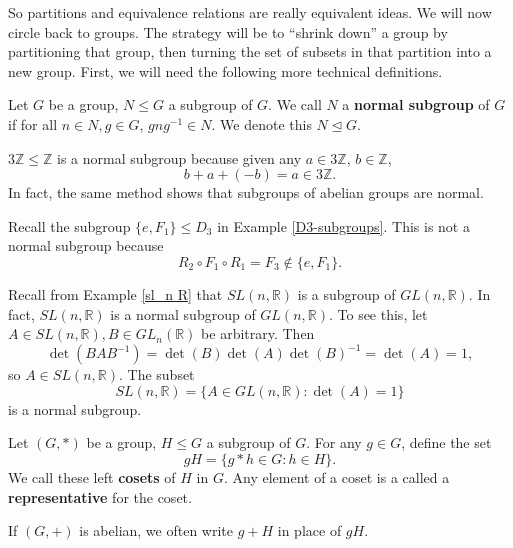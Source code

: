 \documentclass{amsart}
\begin{document}
So partitions and equivalence relations are really equivalent ideas. We will
now circle back to groups. The strategy will be to ``shrink down'' a group by
partitioning that group, then turning the set of subsets in that partition into
a new group. First, we will need the following more technical definitions.

\begin{definition}
	Let \(G\) be a group, \(N\le G\) a subgroup of \(G\). We call \(N\) a
	\textbf{normal subgroup} of \(G\) if for all \(n\in N, g\in G\),
	\(gng^{-1}\in N\). We denote this \(N\trianglelefteq G\).
\end{definition}
\begin{example}\label{3Z-coset}
   \(3\mathbb{Z}\le\mathbb{Z}\) is a normal subgroup because given any
	\(a\in3\mathbb{Z}\), \(b\in \mathbb{Z}\), 
	\[
		b + a + (-b) = a\in 3\mathbb{Z}.
	\]
	In fact, the same method shows that subgroups of abelian groups are
	normal.
\end{example}

\begin{example}\label{not-normal}
	Recall the subgroup \(\{e, F_1\}\le D_3\) in Example \ref{D3-subgroups}.
	This is not a normal subgroup because 
	\[
	   R_2\circ F_1\circ R_1 = F_3\notin \{e, F_1\}.
	\]
\end{example}

\begin{example}\label{sl-normal}
	Recall from Example \ref{sl_n R} that \(SL(n, \mathbb{R})\) is a subgroup of
	\(GL(n, \mathbb{R})\). In fact, \(SL(n, \mathbb{R})\) is a normal subgroup
	of \(GL(n, \mathbb{R})\). To see this, let \(A\in SL(n, \mathbb{R}), B\in
	GL_n(\mathbb{R})\) be
	arbitrary. Then 
	\[
		\det(BAB^{-1}) = \det(B)\det(A)\det(B)^{-1} = \det(A) = 1,
	\]
	so \(A\in SL(n, \mathbb{R})\). The subset 
	\[
	   SL(n, \mathbb{R}) = \{A\in GL(n, \mathbb{R}) : \det(A) = 1\}
	\]
	is a normal subgroup.
\end{example}

\begin{definition}
	Let \((G, \ast)\) be a group, \(H\le G\) a subgroup of \(G\). For any
	\(g\in G\),	define the set 
	\[
		gH = \{g\ast h\in G: h\in H\}.
	\]
	We call these left \textbf{cosets} of \(H\) in \(G\). Any element of a
	coset is a called a \textbf{representative} for the coset.

	If \((G, +)\) is abelian, we often write \(g + H\) in place of \(gH\).
\end{definition}
\end{document}
